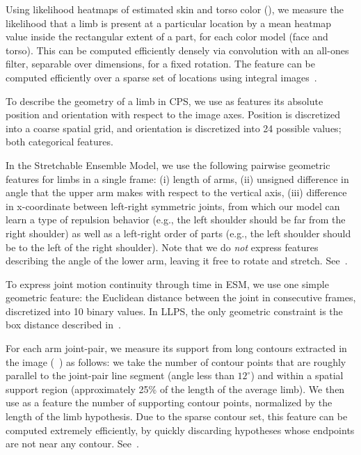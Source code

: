  Using likelihood heatmaps of estimated 
skin and torso color (), we measure the likelihood that a limb is 
present at a particular location by a mean heatmap value inside the rectangular 
extent of a part, for each color model (face and torso). This can be computed 
efficiently densely via convolution with an all-ones filter, separable over 
dimensions, for a fixed rotation.  The feature can be computed efficiently over 
a sparse set of locations using integral images~\citep{viola02}.

 To describe the geometry of a limb in CPS, 
we use as features its absolute position and orientation with respect to the 
image axes.  Position is discretized into a coarse spatial grid, and 
orientation is discretized into 24 possible values; both categorical features.

In the Stretchable Ensemble Model, we use the following pairwise geometric 
features for limbs in a single frame: (i) length of arms, (ii) unsigned 
difference in angle that the upper arm makes with respect to the vertical axis, 
(iii) difference in x-coordinate between left-right symmetric joints, from 
which our model can learn a type of repulsion behavior (e.g., the left shoulder 
should be far from the right shoulder) as well as a left-right order of parts 
(e.g., the left shoulder should be to the left of the right shoulder). Note 
that we do {\em not} express features describing the angle of the lower arm, 
leaving it free to rotate and stretch.
See~.

To express joint motion continuity through time in ESM, we use one simple 
geometric feature: the Euclidean distance between the joint in consecutive 
frames, discretized into 10 binary values.   In LLPS, the only geometric 
constraint is the box distance described in~.

  For each arm joint-pair, we measure its support 
from long contours extracted in the image (~) as follows: we take 
the number of contour points that are roughly parallel to the joint-pair line 
segment (angle less than $12^\circ$) and within a spatial support region 
(approximately 25\% of the length of the average limb).  We then use as a 
feature the number of supporting contour points, normalized by the length of 
the limb hypothesis.  Due to the sparse contour set, this feature can be 
computed extremely efficiently, by quickly discarding hypotheses whose 
endpoints are not near any contour.  See~.

